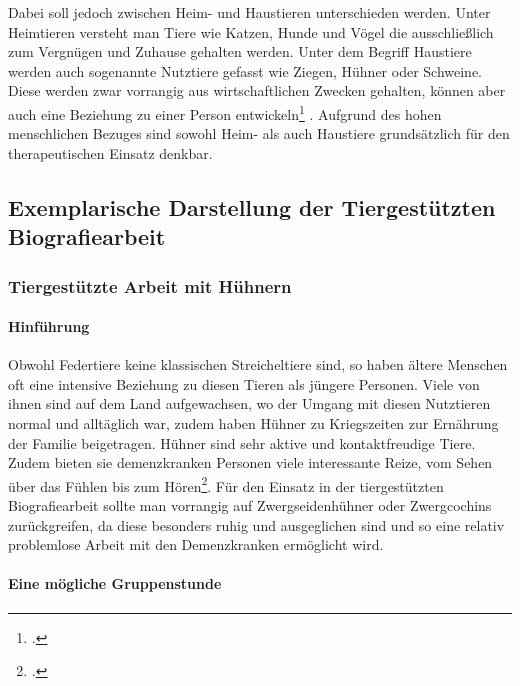 Dabei soll jedoch zwischen Heim- und Haustieren unterschieden werden. Unter Heimtieren versteht man Tiere wie Katzen, Hunde und Vögel die ausschließlich zum Vergnügen und Zuhause gehalten werden. Unter dem Begriff Haustiere werden auch sogenannte Nutztiere gefasst wie Ziegen, Hühner oder Schweine. Diese werden zwar vorrangig aus wirtschaftlichen Zwecken gehalten, können aber auch eine Beziehung zu einer Person entwickeln\footcite[47f]{Leder2006} . Aufgrund des hohen menschlichen Bezuges sind sowohl Heim- als auch Haustiere grundsätzlich für den therapeutischen Einsatz denkbar.

\subsection{Exemplarische Darstellung der Tiergestützten Biografiearbeit}
\label{sec:k4.3_ExemplarischeDarstellungDerTiergestütztenBiografiearbeit}

\subsubsection{Tiergestützte Arbeit mit Hühnern}
\label{sec:k4.3.1_TiergestützteArbeitMitHühnern}

\paragraph{Hinführung}
\label{sec:k4.3.1.1_Hinfuehrung}

Obwohl Federtiere keine klassischen Streicheltiere sind, so haben ältere Menschen oft eine intensive Beziehung zu diesen Tieren als jüngere Personen. Viele von ihnen sind auf dem Land aufgewachsen, wo der Umgang mit diesen Nutztieren normal und alltäglich war, zudem haben Hühner zu Kriegszeiten zur Ernährung der Familie beigetragen. 
Hühner sind sehr aktive und kontaktfreudige Tiere. Zudem bieten sie demenzkranken Personen viele interessante Reize, vom Sehen über das Fühlen bis zum Hören\footcite[33f]{Giruc2011}. Für den Einsatz in der tiergestützten Biografiearbeit sollte man vorrangig auf Zwergseidenhühner oder Zwergcochins zurückgreifen, da diese besonders ruhig und ausgeglichen sind und so eine relativ problemlose Arbeit mit den Demenzkranken ermöglicht wird.

\paragraph{Eine mögliche Gruppenstunde}
\label{sec:k4.3.1.2_EineMöglicheGruppenstunde}

